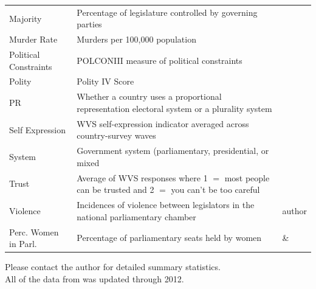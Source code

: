 \documentclass[a4paper]{article}\usepackage[]{graphicx}\usepackage[]{color}
\begin{document}
\begin{table}[!h]
\begin{center}
\begin{tabular}{l m{7cm} m{3.5cm}}
            Majority & Percentage of legislature controlled by governing parties & \cite{DPI2001} \\
            Murder Rate & Murders per 100,000 population & \cite{UNMurder2013} \\
            Political Constraints & POLCONIII measure of political constraints & \cite[][updated through 2011]{Henisz2004} \\
            Polity & Polity IV Score & \cite{Marshall2009} \\
            PR & Whether a country uses a proportional representation electoral system or a plurality system & \cite{DPI2001} \\
            Self Expression & WVS self-expression indicator averaged across country-survey waves & \cite{WVS2009} \\
            System & Government system (parliamentary, presidential, or mixed & \cite{DPI2001} \\
            Trust & Average of WVS responses where 1 $=$ most people can be trusted and 2 $=$ you can't be too careful & \cite{WVS2009} \\
            Violence & Incidences of violence between legislators in the national parliamentary chamber & author \\
            Perc. Women in Parl. & Percentage of parliamentary seats held by women & \cite{WomParCrossNat} \& \cite{IPU2013} \\
            \hline

    \end{tabular}
    \end{center}
    \begin{singlespace}
        Please contact the author for detailed summary statistics. \\
        All of the data from \cite{DPI2001} was updated through 2012.
    \end{singlespace}

\end{table}
\end{document}

